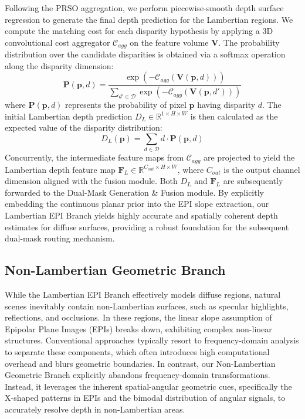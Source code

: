 \documentclass[lettersize,journal]{IEEEtran}
\begin{document}
Following the PRSO aggregation, we perform piecewise-smooth depth surface regression to generate the final depth prediction for the Lambertian regions. We compute the matching cost for each disparity hypothesis by applying a 3D convolutional cost aggregator $\mathcal{C}_{agg}$ on the feature volume $\mathbf{V}$. The probability distribution over the candidate disparities is obtained via a softmax operation along the disparity dimension:
\begin{equation}
\mathbf{P}(\mathbf{p}, d) = \frac{\exp(-\mathcal{C}_{agg}(\mathbf{V}(\mathbf{p}, d)))}{\sum_{d' \in \mathcal{D}} \exp(-\mathcal{C}_{agg}(\mathbf{V}(\mathbf{p}, d')))}
\label{eq:ch3_10}
\end{equation}
where $\mathbf{P}(\mathbf{p}, d)$ represents the probability of pixel $\mathbf{p}$ having disparity $d$. The initial Lambertian depth prediction $D_L \in \mathbb{R}^{1 \times H \times W}$ is then calculated as the expected value of the disparity distribution:
\begin{equation}
D_L(\mathbf{p}) = \sum_{d \in \mathcal{D}} d \cdot \mathbf{P}(\mathbf{p}, d)
\label{eq:ch3_11}
\end{equation}
Concurrently, the intermediate feature maps from $\mathcal{C}_{agg}$ are projected to yield the Lambertian depth feature map $\mathbf{F}_L \in \mathbb{R}^{C_{out} \times H \times W}$, where $C_{out}$ is the output channel dimension aligned with the fusion module. Both $D_L$ and $\mathbf{F}_L$ are subsequently forwarded to the Dual-Mask Generation \& Fusion module. By explicitly embedding the continuous planar prior into the EPI slope extraction, our Lambertian EPI Branch yields highly accurate and spatially coherent depth estimates for diffuse surfaces, providing a robust foundation for the subsequent dual-mask routing mechanism.

\subsection{Non-Lambertian Geometric Branch}

While the Lambertian EPI Branch effectively models diffuse regions, natural scenes inevitably contain non-Lambertian surfaces, such as specular highlights, reflections, and occlusions. In these regions, the linear slope assumption of Epipolar Plane Images (EPIs) breaks down, exhibiting complex non-linear structures. Conventional approaches typically resort to frequency-domain analysis to separate these components, which often introduces high computational overhead and blurs geometric boundaries. In contrast, our Non-Lambertian Geometric Branch explicitly abandons frequency-domain transformations. Instead, it leverages the inherent spatial-angular geometric cues, specifically the X-shaped patterns in EPIs and the bimodal distribution of angular signals, to accurately resolve depth in non-Lambertian areas.
\end{document}
